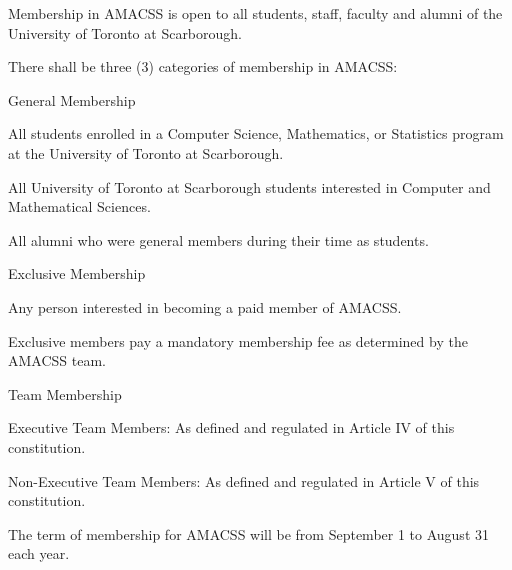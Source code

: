 \documentclass[12pt,a4paper]{article}
\begin{document}
\begin{constitutionlist}
\item Membership in AMACSS is open to all students, staff, faculty and alumni of the University of Toronto at Scarborough.

\item There shall be three (3) categories of membership in AMACSS:

\begin{constitutionlist}
\item General Membership

\begin{constitutionlist}
\item All students enrolled in a Computer Science, Mathematics, or Statistics program at the University of Toronto at Scarborough.

\item All University of Toronto at Scarborough students interested in Computer and Mathematical Sciences.

\item All alumni who were general members during their time as students.
\end{constitutionlist}

\item Exclusive Membership

\begin{constitutionlist}
\item Any person interested in becoming a paid member of AMACSS.

\item Exclusive members pay a mandatory membership fee as determined by the AMACSS team.
\end{constitutionlist}

\item Team Membership

\begin{constitutionlist}
\item Executive Team Members: As defined and regulated in Article IV of this constitution.

\item Non-Executive Team Members: As defined and regulated in Article V of this constitution.
\end{constitutionlist}
\end{constitutionlist}

\item The term of membership for AMACSS will be from September 1 to August 31 each year.


\end{constitutionlist}
\end{document}
